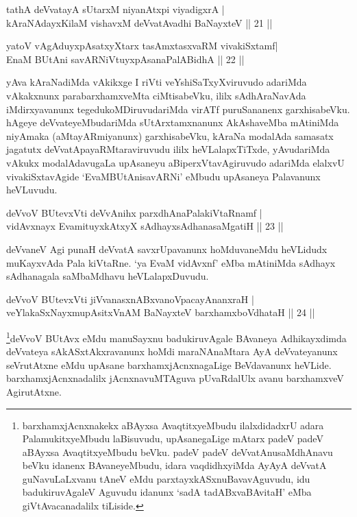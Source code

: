 \begin{shl}
tathA deVvatayA sUtarxM niyanAtx\s pi viyadigxrA |\\
kAraNAdayxKilaM vishavxM deVvatAvadhi BaNayxteV \hfill || 21 || 
\end{shl}

\begin{shl}
yatoV vAgAduyxpAsatxyXtarx tasAmxtasxvaRM vivakiSxtamf|\\
EnaM BUtAni savARNiVtuyxpAsanaPalABidhA \hfill || 22 || 
\end{shl}

\begin{artha}
yAva kAraNadiMda vAkikxge I riVti veYshiSaTxyXviruvudo adariMda vAkakxnunx parabarxhamxveMta ciMtisabeVku, ililx sAdhAraNavAda iMdirxyavanunx tegedukoMDiruvudariMda virATf puruSananenx garxhisabeVku. hAgeye deVvateyeMbudariMda sUtArxtamxnanunx AkAshaveMba mAtiniMda niyAmaka (aMtayARmiyanunx) garxhisabeVku, kAraNa modalAda samasatx jagatutx deVvatApayaRMtaraviruvudu ililx heVLalapxTiTxde, yAvudariMda vAkukx modalAdavugaLa upAsaneyu aBiperxVtavAgiruvudo adariMda elalxvU vivakiSxtavAgide `EvaMBUtAnisavARNi' eMbudu upAsaneya Palavanunx heVLuvudu.
\end{artha}

\begin{shl}
deVvoV BUtevxVti deVvAnihx parxdhAnaPalakiVtaRnamf |\\
vidAvxnayx EvamituyxkAtxyX sAdhayxsAdhanasaMgatiH \hfill || 23 || 
\end{shl}

\begin{artha}
deVvaneV Agi punaH deVvatA savxrUpavanunx hoMduvaneMdu heVLidudx muKayxvAda Pala kiVtaRne. `ya EvaM vidAvxnf' eMba mAtiniMda sAdhayx sAdhanagala saMbaMdhavu heVLalapxDuvudu.
\end{artha}

\begin{shl}
deVvoV BUtevxVti jiVvanasxnABxvanoVpacayAnanxraH |\\
veYlakaSxNayxmupAsitxVnAM BaNayxteV barxhamxboVdhataH \hfill || 24 || 
\end{shl}

\begin{artha}
\footnote{barxhamxjAcnxnakekx aBAyxsa AvaqtitxyeMbudu ilalxdidadxrU adara PalamukitxyeMbudu laBisuvudu, upAsanegaLige mAtarx padeV padeV aBAyxsa AvaqtitxyeMbudu beVku. padeV padeV deVvatAnusaMdhAnavu beVku idanenx BAvaneyeMbudu, idara vaqdidhxyiMda AyAyA deVvatA guNavuLaLxvanu tAneV eMdu parxtayxkASxnuBavavAguvudu, idu badukiruvAgaleV Aguvudu idanunx `sadA tadABxvaBAvitaH' eMba giVtAvacanadalilx tiLiside.}deVvoV BUtAvx eMdu manuSayxnu badukiruvAgale BAvaneya Adhikayxdimda deVvateya sAkASxtAkxravanunx hoMdi maraNAnaMtara AyA deVvateyanunx seVrutAtxne eMdu upAsane barxhamxjAcnxnagaLige BeVdavanunx heVLide. barxhamxjAcnxnadalilx jAcnxnavuMTAguva pUvaRdalUlx avanu barxhamxveV AgirutAtxne.
\end{artha}

